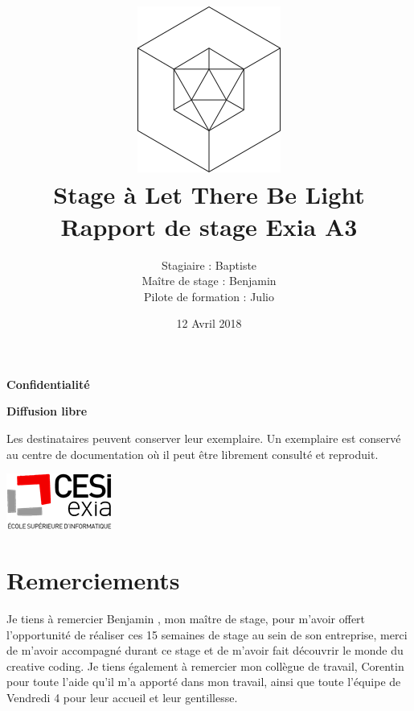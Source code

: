 \documentclass{article}
\title{\includegraphics{img/logo.png}\vspace{2cm}\\
Stage à Let There Be Light \\
\large Rapport de stage Exia A3}
\date{12 Avril 2018}
\author{Stagiaire : Baptiste \bsc{Saclier} \\
Maître de stage : Benjamin \bsc{Petit}\\
Pilote de formation : Julio \bsc{Santilario}}
\begin{document}
    \maketitle

    \vspace{2cm}

    \hspace{\fill}
    \begin{minipage}{10cm}
        \begin{center}
            \textbf{\large Confidentialité}\par
            \textbf{Diffusion libre}
        \end{center}
        Les  destinataires  peuvent  conserver  leur  exemplaire.
        Un  exemplaire  est  conservé  au centre de documentation où il peut être librement consulté et reproduit.
    \end{minipage}
    \hspace{\fill}

    \vspace{\fill}

    \hspace{\fill}\includegraphics{img/exia.png}

    \clearpage

    \tableofcontents

    \vspace{\fill}

    \section*{Remerciements}

    Je tiens à remercier Benjamin , mon maître de stage, pour m'avoir offert l'opportunité de réaliser ces 15 semaines de stage au sein de son entreprise, merci de m'avoir accompagné durant ce stage et de m'avoir fait découvrir le monde du creative coding.
    Je tiens également à remercier mon collègue de travail, Corentin  pour toute l'aide qu'il m'a apporté dans mon travail, ainsi que toute l'équipe de Vendredi 4 pour leur accueil et leur gentillesse.

    \vspace{\fill}

    \clearpage
\end{document}
